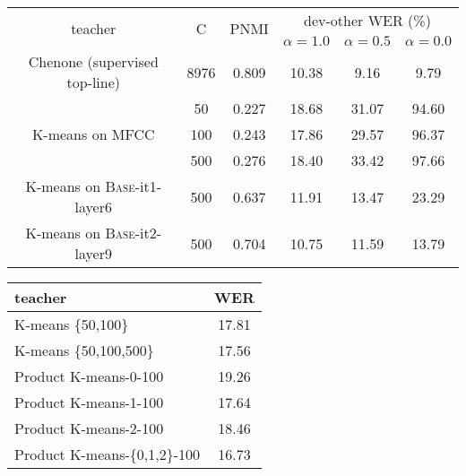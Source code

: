 \begin{table*}[t]
    \begin{minipage}[c]{0.68\textwidth}
        \centering
\begin{tabular}{cc|c|ccc}
    \toprule
    \multirow{2}{*}{teacher} & \multirow{2}{*}{C} & 
    \multirow{2}{*}{PNMI} &
    \multicolumn{3}{c}{dev-other WER (\%)} \\
    & & & $\alpha = 1.0$ & $\alpha = 0.5$ & $\alpha = 0.0$ \\
    \midrule\midrule
    Chenone (supervised top-line)  & 8976 & 0.809 & 10.38 & 9.16 & 9.79 \\
    \midrule
    \multirow{3}{*}{K-means on MFCC} 
    & 50  & 0.227 & 18.68 & 31.07 & 94.60 \\
    & 100 & 0.243 & 17.86 & 29.57 & 96.37 \\
    & 500 & 0.276 & 18.40 & 33.42 & 97.66 \\
    \midrule
    K-means on \textsc{Base}-it1-layer6 & 500 & 0.637 & 11.91 & 13.47 & 23.29 \\
    K-means on \textsc{Base}-it2-layer9 & 500 & 0.704 & 10.75 & 11.59 & 13.79 \\
    \bottomrule
\end{tabular}        \caption{The effect of the training objective and clustering quality on performance. $C$ refers to the number of units, and $\alpha$ is the weight for masked frames.}
        \label{tab:loss}
    \end{minipage}
    \hspace{.5cm}
    \begin{minipage}[c]{0.28\textwidth}
        \centering
\begin{tabular}{lc}
    \toprule
    teacher & WER \\
    \midrule\midrule
    K-means \{50,100\}       & 17.81 \\
    K-means \{50,100,500\}   & 17.56 \\
    \midrule
    Product K-means-0-100 & 19.26 \\
    Product K-means-1-100 & 17.64 \\
    Product K-means-2-100 & 18.46 \\
    Product K-means-\{0,1,2\}-100 & 16.73 \\
    \bottomrule
\end{tabular}%
        \label{tab:ens}
    \end{minipage}
\end{table*}

